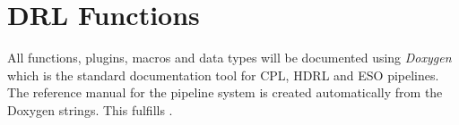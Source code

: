\clearpage
\section{DRL Functions}\label{sec:drl_functions}


All functions, plugins, macros and data types will be documented using
\emph{Doxygen} which is the standard documentation tool for CPL, HDRL and ESO
pipelines. The reference manual for the pipeline system is created automatically
from the Doxygen strings. This fulfills .











